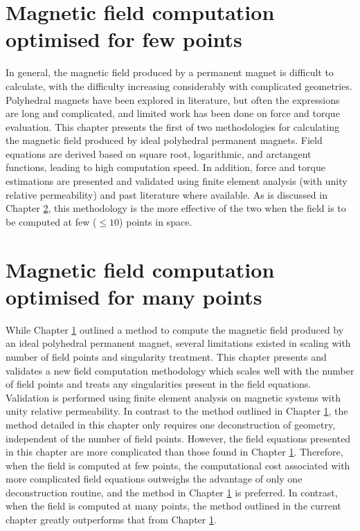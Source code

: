 \documentclass[11pt,a4paper,twoside]{book}
\begin{document}
\chapter{Magnetic field computation optimised for few points}\label{chap:paper1}
In general, the magnetic field produced by a permanent magnet is difficult to calculate, with the difficulty increasing considerably with complicated geometries. Polyhedral magnets have been explored in literature, but often the expressions are long and complicated, and limited work has been done on force and torque evaluation. This chapter presents the first of two methodologies for calculating the magnetic field produced by ideal polyhedral permanent magnets. Field equations are derived based on square root, logarithmic, and arctangent functions, leading to high computation speed. In addition, force and torque estimations are presented and validated using finite element analysis (with unity relative permeability) and past literature where available. As is discussed in Chapter \ref{chap:paper2}, this methodology is the more effective of the two when the field is to be computed at few (\(\leq 10\)) points in space.

\chapter{Magnetic field computation optimised for many points}\label{chap:paper2}
While Chapter \ref{chap:paper1} outlined a method to compute the magnetic field produced by an ideal polyhedral permanent magnet, several limitations existed in scaling with number of field points and singularity treatment. This chapter presents and validates a new field computation methodology which scales well with the number of field points and treats any singularities present in the field equations. Validation is performed using finite element analysis on magnetic systems with unity relative permeability. In contrast to the method outlined in Chapter \ref{chap:paper1}, the method detailed in this chapter only requires one deconstruction of geometry, independent of the number of field points. However, the field equations presented in this chapter are more complicated than those found in Chapter \ref{chap:paper1}. Therefore, when the field is computed at few points, the computational cost associated with more complicated field equations outweighs the advantage of only one deconstruction routine, and the method in Chapter \ref{chap:paper1} is preferred. In contrast, when the field is computed at many points, the method outlined in the current chapter greatly outperforms that from Chapter \ref{chap:paper1}.
\end{document}

